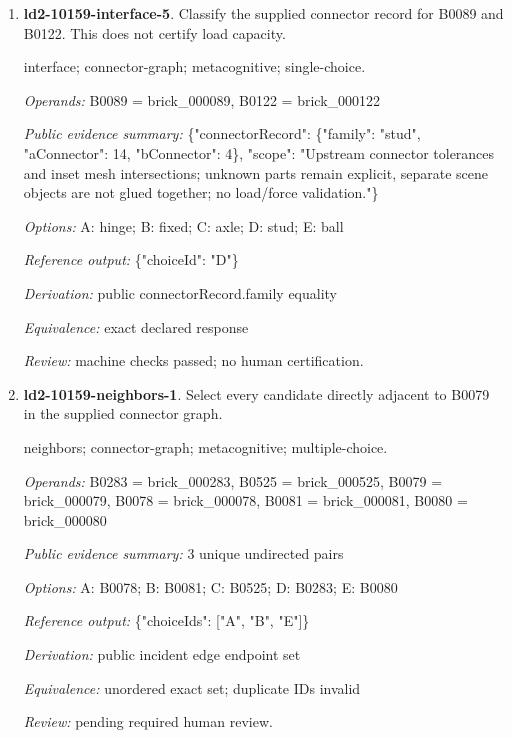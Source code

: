 \begin{enumerate}
\par{\small interface; connector-graph; metacognitive; single-choice.\par\textit{Operands:} B0539 = brick\_000539, B0545 = brick\_000545\par\textit{Public evidence summary:} \{"connectorRecord": \{"family": "hinge", "aConnector": 3, "bConnector": 1\}, "scope": "Upstream connector tolerances and inset mesh intersections; unknown parts remain explicit, separate scene objects are not glued together; no load/force validation."\}\par\textit{Options:} A: axle; B: stud; C: hinge; D: fixed; E: ball\par\textit{Reference output:} \{"choiceId": "C"\}\par\textit{Derivation:} public connectorRecord.family equality\par\textit{Equivalence:} exact declared response\par\textit{Review:} pending required human review.}
\item \textbf{ld2-10159-interface-5}. Classify the supplied connector record for B0089 and B0122. This does not certify load capacity.
\par{\small interface; connector-graph; metacognitive; single-choice.\par\textit{Operands:} B0089 = brick\_000089, B0122 = brick\_000122\par\textit{Public evidence summary:} \{"connectorRecord": \{"family": "stud", "aConnector": 14, "bConnector": 4\}, "scope": "Upstream connector tolerances and inset mesh intersections; unknown parts remain explicit, separate scene objects are not glued together; no load/force validation."\}\par\textit{Options:} A: hinge; B: fixed; C: axle; D: stud; E: ball\par\textit{Reference output:} \{"choiceId": "D"\}\par\textit{Derivation:} public connectorRecord.family equality\par\textit{Equivalence:} exact declared response\par\textit{Review:} machine checks passed; no human certification.}
\item \textbf{ld2-10159-neighbors-1}. Select every candidate directly adjacent to B0079 in the supplied connector graph.
\par{\small neighbors; connector-graph; metacognitive; multiple-choice.\par\textit{Operands:} B0283 = brick\_000283, B0525 = brick\_000525, B0079 = brick\_000079, B0078 = brick\_000078, B0081 = brick\_000081, B0080 = brick\_000080\par\textit{Public evidence summary:} 3 unique undirected pairs\par\textit{Options:} A: B0078; B: B0081; C: B0525; D: B0283; E: B0080\par\textit{Reference output:} \{"choiceIds": ["A", "B", "E"]\}\par\textit{Derivation:} public incident edge endpoint set\par\textit{Equivalence:} unordered exact set; duplicate IDs invalid\par\textit{Review:} pending required human review.}

\end{enumerate}
